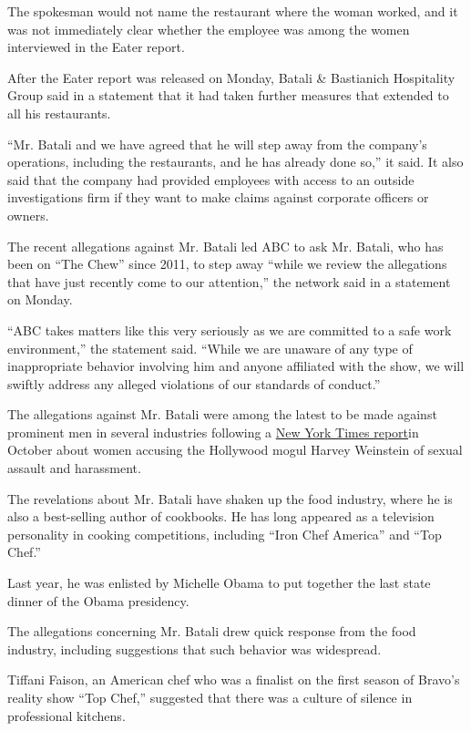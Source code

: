 The spokesman would not name the restaurant where the woman worked, and
it was not immediately clear whether the employee was among the women
interviewed in the Eater report.

After the Eater report was released on Monday, Batali \& Bastianich
Hospitality Group said in a statement that it had taken further measures
that extended to all his restaurants.

``Mr. Batali and we have agreed that he will step away from the
company's operations, including the restaurants, and he has already done
so,'' it said. It also said that the company had provided employees with
access to an outside investigations firm if they want to make claims
against corporate officers or owners.

The recent allegations against Mr. Batali led ABC to ask Mr. Batali, who
has been on ``The Chew'' since 2011, to step away ``while we review the
allegations that have just recently come to our attention,'' the network
said in a statement on Monday.

``ABC takes matters like this very seriously as we are committed to a
safe work environment,'' the statement said. ``While we are unaware of
any type of inappropriate behavior involving him and anyone affiliated
with the show, we will swiftly address any alleged violations of our
standards of conduct.''

The allegations against Mr. Batali were among the latest to be made
against prominent men in several industries following a
\href{https://www.nytimes3xbfgragh.onion/2017/10/05/us/harvey-weinstein-harassment-allegations.html}{New
York Times report}in October about women accusing the Hollywood mogul
Harvey Weinstein of sexual assault and harassment.

The revelations about Mr. Batali have shaken up the food industry, where
he is also a best-selling author of cookbooks. He has long appeared as a
television personality in cooking competitions, including ``Iron Chef
America'' and ``Top Chef.''

Last year, he was enlisted by Michelle Obama to put together the last
state dinner of the Obama presidency.

The allegations concerning Mr. Batali drew quick response from the food
industry, including suggestions that such behavior was widespread.

Tiffani Faison, an American chef who was a finalist on the first season
of Bravo's reality show ``Top Chef,'' suggested that there was a culture
of silence in professional kitchens.

